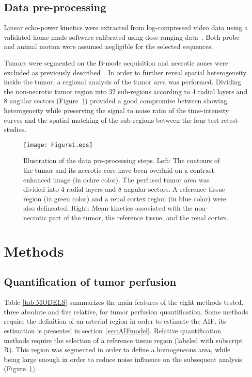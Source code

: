 \subsection{Data pre-processing}
Linear echo-power kinetics were extracted from log-compressed video data using a validated home-made software calibrated using dose-ranging data~\cite{Payen2013jc}.
Both probe and animal motion were assumed negligible for the selected sequences. 

Tumors were segmented on the B-mode acquisition and necrotic zones were excluded as previously described~\cite{Dizeux2016cd}. 
In order to further reveal spatial heterogeneity inside the tumor, a regional analysis of the tumor area was performed. Dividing the non-necrotic tumor region into 32 sub-regions according to 4 radial layers and 8 angular sectors (Figure~\ref{fig:Ch3Segmentation}) provided a good compromise between showing heterogeneity while preserving the signal to noise ratio of the time-intensity curves and the spatial matching of the sub-regions between the four test-retest studies.

\begin{figure}[ht]
  	\centering
  	\texttt{[image: Figure1.eps]}
	\caption{Illustration of the data pre-processing steps. Left: The contours of the tumor and its necrotic core have been overlaid on a  contrast enhanced image (in ochre color). The perfused tumor area was divided into 4 radial layers and 8 angular sectors. A reference tissue region (in green color) and a renal cortex region (in blue color) were also delineated. Right: Mean kinetics associated with the non-necrotic part of the tumor, the reference tissue, and the renal cortex.} 
  	\label{fig:Ch3Segmentation}
\end{figure}

\section{Methods}

\subsection{Quantification of tumor perfusion}
\label{sec:models}
Table \ref{tab:MODELS} summarizes the main features of the eight methods tested, three absolute and five relative, for tumor perfusion quantification. Some methods require the definition of an arterial region in order to estimate the AIF, its estimation is presented in section~\ref{sec:AIFmodel}. Relative quantification methods require the selection of a reference tissue region (labeled with subscript R). This region was segmented in order to define a homogeneous area, while being large enough in order to reduce noise influence on the subsequent analysis (Figure~\ref{fig:Ch3Segmentation}).

